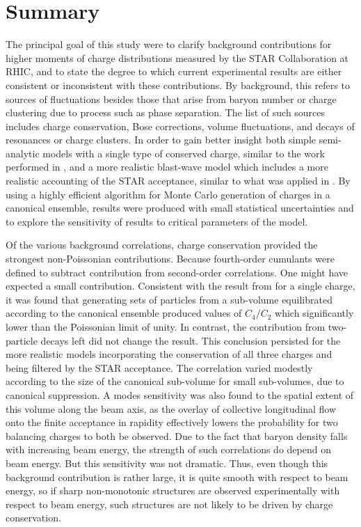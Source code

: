 
\section{Summary}\label{sec:summary}
 
The principal goal of this study were to clarify background contributions for higher moments of charge distributions measured by the STAR Collaboration at RHIC, and to state the degree to which current experimental results are either consistent or inconsistent with these contributions. By background, this refers to sources of fluctuations besides those that arise from baryon number or charge clustering due to process such as phase separation. The list of such sources includes charge conservation, Bose corrections, volume fluctuations, and decays of resonances or charge clusters. In order to gain better insight both simple semi-analytic models with a single type of conserved charge, similar to the work performed in \cite{Savchuk:2019xfg}, and a more realistic blast-wave model which includes a more realistic accounting of the STAR acceptance, similar to what was applied in \cite{Oliinychenko:2020cmr}. By using a highly efficient algorithm for Monte Carlo generation of charges in a canonical ensemble, results were produced with small statistical uncertainties and to explore the sensitivity of results to critical parameters of the model.

Of the various background correlations, charge conservation provided the strongest non-Poissonian contributions. Because fourth-order cumulants were defined to subtract contribution from second-order correlations. One might have expected a small contribution. Consistent with the result from \cite{Savchuk:2019xfg} for a single charge, it was found that generating sets of particles from a sub-volume equilibrated according to the canonical ensemble produced values of $C_4/C_2$ which significantly lower than the Poissonian limit of unity. In contrast, the contribution from two-particle decays left did not change the result. This conclusion persisted for the more realistic models incorporating the conservation of all three charges and being filtered by the STAR acceptance. The correlation varied modestly according to the size of the canonical sub-volume for small sub-volumes, due to canonical suppression. A modes sensitivity was also found to the spatial extent of this volume along the beam axis, as the overlay of collective longitudinal flow onto the finite acceptance in rapidity effectively lowers the probability for two balancing charges to both be observed. Due to the fact that baryon density falls with increasing beam energy, the strength of such correlations do depend on beam energy. But this sensitivity was not dramatic. Thus, even though this background contribution is rather large, it is quite smooth with respect to beam energy, so if sharp non-monotonic structures are observed experimentally with respect to beam energy, such structures are not likely to be driven by charge conservation. 

